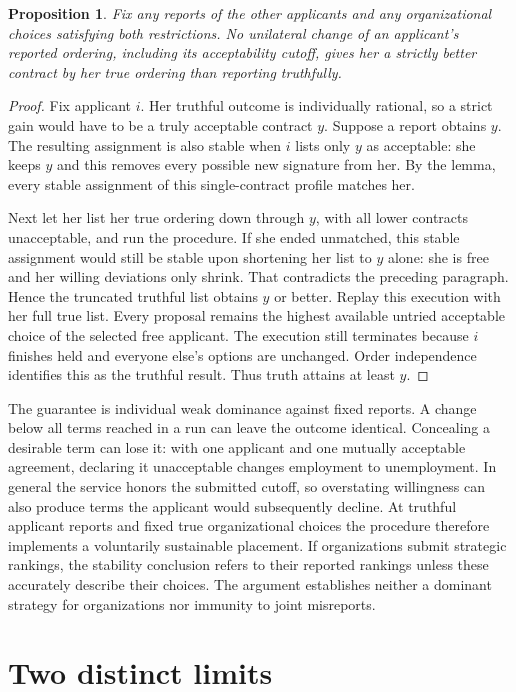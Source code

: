 \documentclass[11pt]{article}
\newtheorem{proposition}{Proposition}
\begin{document}
\begin{proposition}
Fix any reports of the other applicants and any organizational choices satisfying both restrictions. No unilateral change of an applicant's reported ordering, including its acceptability cutoff, gives her a strictly better contract by her true ordering than reporting truthfully.
\end{proposition}
\begin{proof}
Fix applicant $i$. Her truthful outcome is individually rational, so a strict gain would have to be a truly acceptable contract $y$. Suppose a report obtains $y$. The resulting assignment is also stable when $i$ lists only $y$ as acceptable: she keeps $y$ and this removes every possible new signature from her. By the lemma, every stable assignment of this single-contract profile matches her.

Next let her list her true ordering down through $y$, with all lower contracts unacceptable, and run the procedure. If she ended unmatched, this stable assignment would still be stable upon shortening her list to $y$ alone: she is free and her willing deviations only shrink. That contradicts the preceding paragraph. Hence the truncated truthful list obtains $y$ or better. Replay this execution with her full true list. Every proposal remains the highest available untried acceptable choice of the selected free applicant. The execution still terminates because $i$ finishes held and everyone else's options are unchanged. Order independence identifies this as the truthful result. Thus truth attains at least $y$.
\end{proof}

The guarantee is individual weak dominance against fixed reports. A change below all terms reached in a run can leave the outcome identical. Concealing a desirable term can lose it: with one applicant and one mutually acceptable agreement, declaring it unacceptable changes employment to unemployment. In general the service honors the submitted cutoff, so overstating willingness can also produce terms the applicant would subsequently decline. At truthful applicant reports and fixed true organizational choices the procedure therefore implements a voluntarily sustainable placement. If organizations submit strategic rankings, the stability conclusion refers to their reported rankings unless these accurately describe their choices. The argument establishes neither a dominant strategy for organizations nor immunity to joint misreports.

\section{Two distinct limits}
\end{document}
